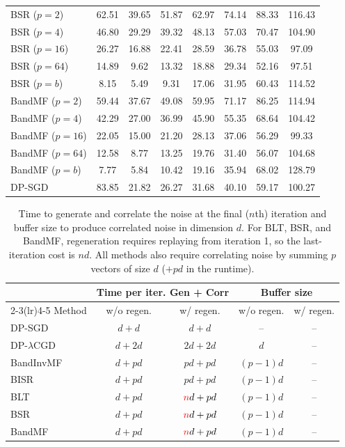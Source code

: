 \documentclass{article}
\theoremstyle{plain}
\theoremstyle{definition}
\theoremstyle{remark}
\newcommand{\method}{DP-$\lambda$CGD\xspace}
\begin{document}
\begin{table}[t]
\begin{tabular}{lccccccc}
\addlinespace
BSR ($p=2$)  & 62.51 & 39.65 & 51.87 & 62.97 & 74.14 & 88.33 & 116.43 \\
BSR ($p=4$)  & 46.80 & 29.29 & 39.32 & 48.13 & 57.03 & 70.47 & 104.90 \\
BSR ($p=16$) & 26.27 & 16.88 & 22.41 & 28.59 & 36.78 & 55.03 & 97.09 \\
BSR ($p=64$) & 14.89 & 9.62  & 13.32 & 18.88 & 29.34 & 52.16 & 97.51 \\
BSR ($p=b$)  & 8.15  & 5.49  & 9.31  & 17.06 & 31.95 & 60.43 & 114.52 \\
\addlinespace
BandMF ($p=2$)  & 59.44 & 37.67 & 49.08 & 59.95 & 71.17 & 86.25 & 114.94 \\
BandMF ($p=4$)  & 42.29 & 27.00 & 36.99 & 45.90 & 55.35 & 68.64 & 104.42 \\
BandMF ($p=16$) & 22.05 & 15.00 & 21.20 & 28.13 & 37.06 & 56.29 & 99.33 \\
BandMF ($p=64$) & 12.58 & 8.77  & 13.25 & 19.76 & 31.40 & 56.07 & 104.68 \\
BandMF ($p=b$)  & 7.77  & 5.84  & 10.42 & 19.16 & 35.94 & 68.02 & 128.79 \\
\addlinespace
DP-SGD & 83.85 & 21.82 & 26.27 & 31.68 & 40.10 & 59.17 & 100.27 \\
\bottomrule
\end{tabular}%
\end{table}

\begin{table}[t]
\caption{Time to generate and correlate the noise at the final ($n$th) iteration and buffer size to produce correlated noise in dimension $d$. For BLT, BSR, and BandMF, regeneration requires replaying from iteration 1, so the last-iteration cost is $nd$. All methods also require correlating noise by summing $p$ vectors of size $d$ ($+pd$ in the runtime).}
\centering
\small
\setlength{\tabcolsep}{4.5pt}
\renewcommand{\arraystretch}{1.15}
\begin{tabular}{lcccc}
\toprule
& \multicolumn{2}{c}{Time per iter. Gen + Corr} & \multicolumn{2}{c}{Buffer size} \\
\cmidrule(lr){2-3}\cmidrule(lr){4-5}
Method & w/o regen. & w/ regen. & w/o regen. & w/ regen. \\
\midrule
DP-SGD     & $d + d$  & $d + d$  & --        & -- \\
\method    & $d + 2d$  & $2d + 2d$ & $d$       & -- \\
BandInvMF  & $d + pd$  & $pd+ pd$ & $(p-1)d$  & -- \\
BISR       & $d+ pd$  & $pd+ pd$ & $(p-1)d$  & -- \\
BLT        & $d+ pd$  & $\textcolor{red}{n}d+ pd$ & $(p-1)d$  & -- \\
BSR        & $d+ pd$  & $\textcolor{red}{n}d+ pd$ & $(p-1)d$  & -- \\
BandMF     & $d+ pd$  & $\textcolor{red}{n}d+ pd$ & $(p-1)d$  & -- \\
\bottomrule
\end{tabular}
\label{tab:noise_time_buffer}
\end{table}
\end{document}
